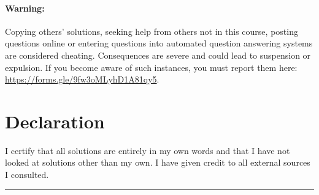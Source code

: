 \documentclass[10pt]{article}
\newcommand{\signature}{    %
  \parbox{\textwidth}{
    \vspace{2cm}
    \parbox{7cm}{
      \centering
      \rule{6cm}{1pt}\\
       \theauthor
    }
  }
}
\newcommand\pagenums{\setcounter{tocdepth}{2}\tableofcontents}
\begin{document}
\paragraph{Warning:}{Copying others’ solutions, seeking help from others not in this course, posting questions online or entering questions into automated question answering systems are considered cheating. Consequences are severe and could lead to suspension or expulsion. If you become aware of such instances, you must report them here: \url{https://forms.gle/9fw3oMLyhD1A81qy5}.}


\pagenums

\section*{Declaration}

I certify that all solutions are entirely in my own words and that I have not looked at solutions other than my own. I have given credit to all external sources I consulted.

\signature




\end{document}
